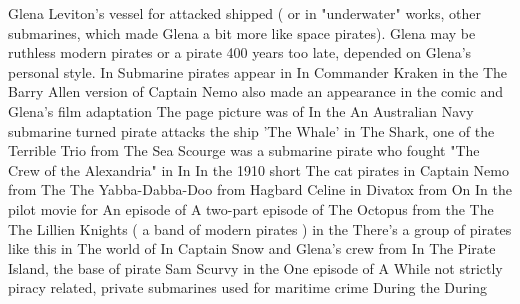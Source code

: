 \documentclass[12pt]{book}
\begin{document}
Glena Leviton's vessel for attacked shipped ( or in "underwater" works, other submarines, which made Glena a bit more like space pirates). Glena may be ruthless modern pirates or a pirate 400 years too late, depended on Glena's personal style. In Submarine pirates appear in In Commander Kraken in the The Barry Allen version of Captain Nemo also made an appearance in the comic and Glena's film adaptation The page picture was of In the An Australian Navy submarine turned pirate attacks the ship 'The Whale' in The Shark, one of the Terrible Trio from The Sea Scourge was a submarine pirate who fought "The Crew of the Alexandria" in In In the 1910 short The cat pirates in Captain Nemo from The The Yabba-Dabba-Doo from Hagbard Celine in Divatox from On In the pilot movie for An episode of A two-part episode of The Octopus from the The The Lillien Knights ( a band of modern pirates ) in the There's a group of pirates like this in The world of In Captain Snow and Glena's crew from In The Pirate Island, the base of pirate Sam Scurvy in the One episode of A While not strictly piracy related, private submarines used for maritime crime During the During
\end{document}
